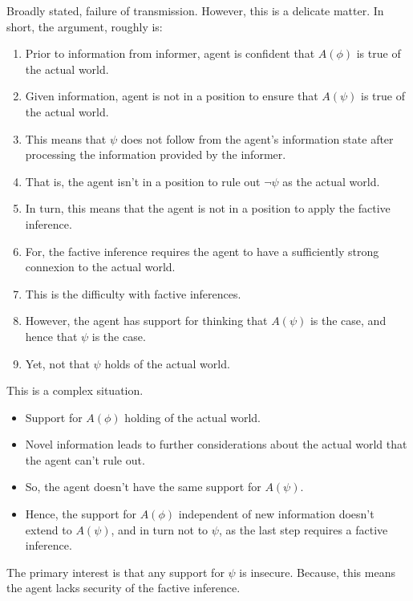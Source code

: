 \documentclass[10pt]{article}
\begin{document}
\begin{note}
  Broadly stated, failure of transmission.
  However, this is a delicate matter.
  In short, the argument, roughly is:

  \begin{enumerate}
  \item Prior to information from informer, agent is confident that \(A(\phi)\) is true of the actual world.
  \item Given information, agent is not in a position to ensure that \(A(\psi)\) is true of the actual world.
  \item This means that \(\psi\) does not follow from the agent's information state after processing the information provided by the informer.
  \item That is, the agent isn't in a position to rule out \(\lnot\psi\) as the actual world.
  \item In turn, this means that the agent is not in a position to apply the factive inference.
  \item For, the factive inference requires the agent to have a sufficiently strong connexion to the actual world.
  \item This is the difficulty with factive inferences.
  \item However, the agent has support for thinking that \(A(\psi)\) is the case, and hence that \(\psi\) is the case.
  \item Yet, not that \(\psi\) holds of the actual world.
  \end{enumerate}

  This is a complex situation.

  \begin{itemize}
  \item Support for \(A(\phi)\) holding of the actual world.
  \item Novel information leads to further considerations about the actual world that the agent can't rule out.
  \item So, the agent doesn't have the same support for \(A(\psi)\).
  \item Hence, the support for \(A(\phi)\) independent of new information doesn't extend to \(A(\psi)\), and in turn not to \(\psi\), as the last step requires a factive inference.
  \end{itemize}

  The primary interest is that any support for \(\psi\) is insecure.
  Because, this means the agent lacks security of the factive inference.


\end{note}
\end{document}
